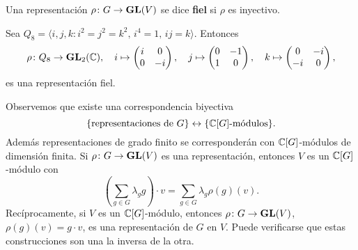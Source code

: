 Una representación $\rho\colon G\to\mathbf{GL}(V)$ se dice \textbf{fiel} si $\rho$
es inyectivo.

\begin{example}
	Sea $Q_8=\langle i,j,k:i^2=j^2=k^2,\,i^4=1,\,ij=k\rangle$. Entonces 
	\[
		\rho\colon Q_8\to\mathbf{GL}_2(\mathbb{C}),\quad
		i\mapsto\begin{pmatrix}
			i & 0\\
			0 & -i
		\end{pmatrix},
		\quad
		j\mapsto\begin{pmatrix}
			0 & -1\\
			1 & 0
		\end{pmatrix},
		\quad
		k\mapsto\begin{pmatrix}
			0 & -i\\
			-i & 0
		\end{pmatrix},
	\]
	es una representación fiel. 
\end{example}

Observemos que existe una correspondencia biyectiva 
\[
\{\text{representaciones de $G$}\}\leftrightarrow\{\text{$\mathbb{C}[G]$-módulos}\}.
\]
Además representaciones de grado finito se corresponderán con $\mathbb{C}[G]$-módulos de dimensión finita. 
Si $\rho\colon G\to\mathbf{GL}(V)$ es una representación, entonces 
$V$ es un $\mathbb{C}[G]$-módulo con
\[
\left(\sum_{g\in G}\lambda_gg\right)\cdot v=\sum_{g\in G}\lambda_g\rho(g)(v).
\]
Recíprocamente, si $V$ es un $\mathbb{C}[G]$-módulo, entonces $\rho\colon G\to\mathbf{GL}(V)$, 
$\rho(g)(v)=g\cdot v$, es una representación de $G$ en $V$. Puede verificarse que estas
construcciones son una la inversa de la otra.  

%



